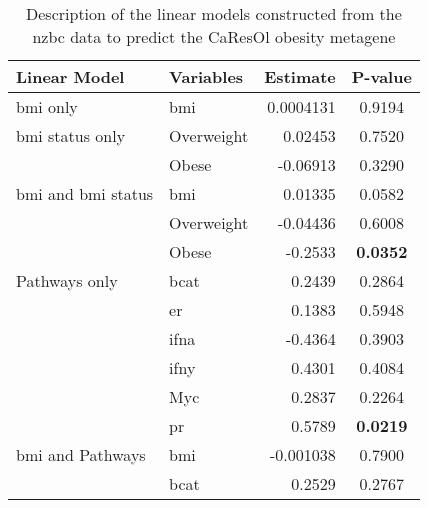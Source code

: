 	\begin{table}[htpb]
		\centering
		\caption{Description of the linear models constructed from the \gls{nzbc} data to predict the CaResOl obesity metagene}
		\label{tab:lm_sig_var_caresol}
		\begin{threeparttable}
			\begin{tabular}{llrc}
				Linear Model & Variables & Estimate & P-value\\
				\hline
				\hline
				\rule{0pt}{2.25ex}\gls{bmi} only                           & \gls{bmi}  & 0.0004131 & 0.9194 \\
				\hline
				\rule{0pt}{2.25ex}\gls{bmi} status only                    & Overweight & 0.02453   & 0.7520 \\
                                                                           & Obese      & -0.06913  & 0.3290 \\
				\hline
				\rule{0pt}{2.25ex}\gls{bmi} and \gls{bmi} status           & \gls{bmi}  & 0.01335   & 0.0582 \\
                                                                           & Overweight & -0.04436  & 0.6008 \\
                                                                           & Obese      & -0.2533   & \bfseries 0.0352  \\
				\hline
				\rule{0pt}{2.25ex}Pathways only                            & \gls{bcat} & 0.2439    & 0.2864 \\
                                                                           & \gls{er}   & 0.1383    & 0.5948 \\
                                                                           & \gls{ifna} & -0.4364   & 0.3903 \\
                                                                           & \gls{ifny} & 0.4301    & 0.4084 \\
                                                                           & Myc        & 0.2837    & 0.2264 \\
                                                                           & \gls{pr}   & 0.5789    & \bfseries 0.0219  \\
				\hline
				\rule{0pt}{2.25ex}\gls{bmi} and Pathways                   & \gls{bmi}  & -0.001038 & 0.7900 \\
                                                                           & \gls{bcat} & 0.2529    & 0.2767 \\

\end{tabular}
\end{threeparttable}
\end{table}
